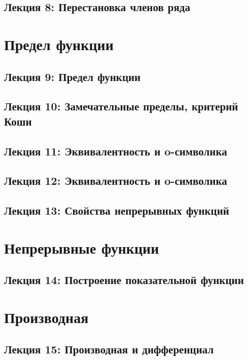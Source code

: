 	\section*{Лекция 8: Перестановка членов ряда}
	
	\chapter{Предел функции}
	
	\section*{Лекция 9: Предел функции}
	
	\section*{Лекция 10: Замечательные пределы, критерий Коши}
	
	\section*{Лекция 11: Эквивалентность и o-символика}
	
	\section*{Лекция 12: Эквивалентность и o-символика}
	
	\section*{Лекция 13: Свойства непрерывных функций}
	
	\chapter{Непрерывные функции}
	
	\section*{Лекция 14: Построение показательной функции}
	
	\chapter{Производная}
	
	\section*{Лекция 15: Производная и дифференциал}
	
